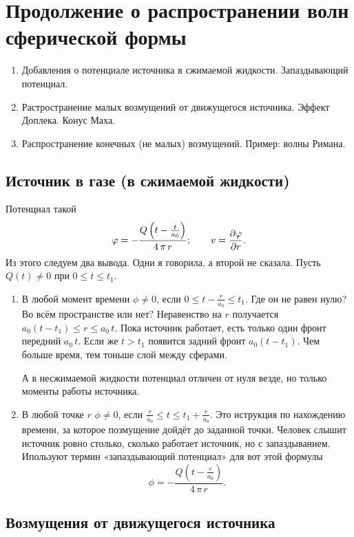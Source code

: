 \section{Продолжение о распространении волн сферической формы}
\begin{enumerate}
  \item Добавления о потенциале источника в сжимаемой жидкости. Запаздывающий потенциал.
  \item Растространение малых возмущений от движущегося источника. Эффект Доплека. Конус Маха.
  \item Распространение конечных (не малых) возмущений. Пример: волны Римана.
\end{enumerate}

\subsection{Источник в газе (в сжимаемой жидкости)}
Потенциал такой
\[
  \varphi = -\frac{Q\left(t - \frac t{a_0}\right)}{4\,\pi\,r};\qquad v = \frac{\partial \varphi}{\partial r}.
\]
Из этого следуем два вывода. Одни я говорила, а второй не сказала.
Пусть $Q(t)\ne0$ при $0\le t\le t_1$.
\begin{enumerate}
\item В любой момент времени $\phi\ne0$, если $0\le t-\frac r{a_0}\le t_1$. Где он не равен нулю? Во всём пространстве или нет? Неравенство на $r$ получается $a_0(t-t_1)\le  r\le a_0\,t$.
Пока источник работает, есть только один фронт передний $a_0\,t$. Если же $t>t_1$ появится задний фронт $a_0(t-t_1)$. Чем больше время, тем тоньше слой между сферами.

А в несжимаемой жидкости потенциал отличен от нуля везде, но только моменты работы источника.

\item В любой точке $r$ $\phi\ne0$, если $\frac r{a_0}\le t\le t_1 + \frac r{a_0}$.
Это иструкция по нахождению времени, за которое позмущение дойдёт до заданной точки. Человек слышит источник ровно столько, сколько работает источник, но с запаздыванием.
Ипользуют термин «запаздывающий потенциал» для вот этой формулы
\[
  \phi = -\frac{Q\left(t-\frac r{a_0}\right)}{4\,\pi\,r}.
\]
\end{enumerate}
\subsection{Возмущения от движущегося источника}
